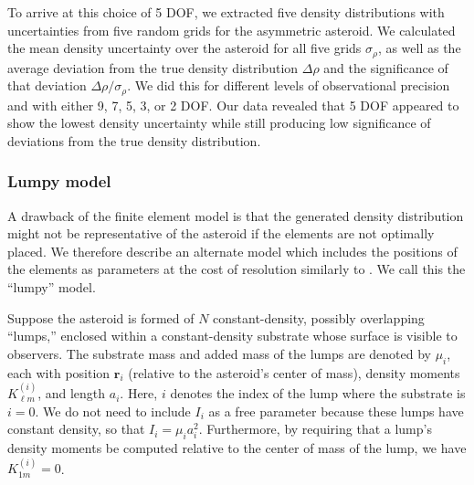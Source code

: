 \documentclass[fleqn,usenatbib]{mnras}
\begin{document}
To arrive at this choice of 5 DOF, we extracted five density distributions with uncertainties from five random grids for the asymmetric asteroid. We calculated the mean density uncertainty over the asteroid for all five grids $\sigma_\rho$, as well as the average deviation from the true density distribution $\Delta \rho$ and the significance of that deviation $\Delta \rho / \sigma_\rho$. We did this for different levels of observational precision and with either 9, 7, 5, 3, or 2 DOF. Our data revealed that 5 DOF appeared to show the lowest density uncertainty while still producing low significance of deviations from the true density distribution.

\subsubsection{Lumpy model}

A drawback of the finite element model is that the generated density distribution might not be representative of the asteroid if the elements are not optimally placed. We therefore describe an alternate model which includes the positions of the elements as parameters at the cost of resolution similarly to \cite{dewit2012}. We call this the ``lumpy'' model.

Suppose the asteroid is formed of $N$ constant-density, possibly overlapping ``lumps,'' enclosed within a constant-density substrate whose surface is visible to observers. The substrate mass and added mass of the lumps are denoted by $\mu_i$, each with position $\bm r_i$ (relative to the asteroid's center of mass), density moments $K_{\ell m}^{(i)}$, and length $a_i$. Here, $i$ denotes the index of the lump where the substrate is $i=0$.  We do not need to include $I_i$ as a free parameter because these lumps have constant density, so that $I_i = \mu_i a_i^2$. Furthermore, by requiring that a lump's density moments be computed relative to the center of mass of the lump, we have $K_{1m}^{(i)} = 0$.
\end{document}
